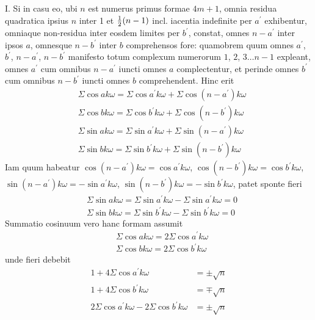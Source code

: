 \documentclass[twoside,12pt]{memoir}
\let\oldfrac\frac
\def\frac#1#2{\mathchoice{\tfrac{#1}{#2}}{\oldfrac{#1}{#2}}{\genfrac{}{}{}{2}{#1}{#2\mathstrut}}{\genfrac{}{}{}{3}{#1}{#2\mathstrut}}}
\begin{document}
I. Si in casu eo, ubi \(n\) est numerus primus formae \(4 m+1\), omnia residua quadratica ipsius \(n\) inter 1 et \(\frac{1}{2}(n-1)\) incl. iacentia indefinite per \(a^{\prime}\) exhibentur, omniaque non-residua inter eosdem limites per \(b^{\prime}\), constat, omnes \(n-a^{\prime}\) inter ipsos \(a\), omnesque \(n-b^{\prime}\) inter \(b\) comprehensos fore: quamobrem quum omnes \(a^{\prime}\), \(b^{\prime}\), \(n-a^{\prime}\), \(n-b^{\prime}\) manifesto totum complexum numerorum \(1\), \(2\), \(3 \ldots n-1\) expleant, omnes \(a^{\prime}\) cum omnibus \(n-a^{\prime}\) iuncti omnes \(a\) complectentur, et perinde omnes \(b^{\prime}\) cum omnibus \(n-b^{\prime}\) iuncti omnes \(b\) comprehendent. Hinc erit\pagebreak%
\[\begin{aligned}
& \Sigma \cos a k \omega=\Sigma \cos a^{\prime} k \omega+\Sigma \cos (n-a^{\prime}) k \omega \\
& \Sigma \cos b k \omega=\Sigma \cos b^{\prime} k \omega+\Sigma \cos (n-b^{\prime}) k \omega \\
& \Sigma \sin a k \omega=\Sigma \sin a^{\prime} k \omega+\Sigma \sin (n-a^{\prime}) k \omega \\
& \Sigma \sin b k \omega=\Sigma \sin b^{\prime} k \omega+\Sigma \sin (n-b^{\prime}) k \omega
\end{aligned}\]
Iam quum habeatur \(\cos (n-a^{\prime}) k \omega=\cos a^{\prime} k \omega\), \(\cos (n-b^{\prime}) k \omega=\cos b^{\prime} k \omega\), \(\sin (n-a^{\prime}) k \omega=-\sin a^{\prime} k \omega\), \(\sin (n-b^{\prime}) k \omega=-\sin b^{\prime} k \omega\), patet sponte fieri
\[\begin{aligned}
& \Sigma \sin a k \omega=\Sigma \sin a^{\prime} k \omega-\Sigma \sin a^{\prime} k \omega=0 \\
& \Sigma \sin b k \omega=\Sigma \sin b^{\prime} k \omega-\Sigma \sin b^{\prime} k \omega=0
\end{aligned}\]
Summatio cosinuum vero hanc formam assumit
\[\begin{aligned}
& \Sigma \cos a k \omega=2 \Sigma \cos a^{\prime} k \omega \\
& \Sigma \cos b k \omega=2 \Sigma \cos b^{\prime} k \omega
\end{aligned}\]
unde fieri debebit
\[\begin{aligned}
1+4 \Sigma \cos a^{\prime} k \omega & = \pm \surd n \\
1+4 \Sigma \cos b^{\prime} k \omega & = \mp \surd n \\
2 \Sigma \cos a^{\prime} k \omega-2 \Sigma \cos b^{\prime} k \omega & = \pm \surd n
\end{aligned}\]
\end{document}
